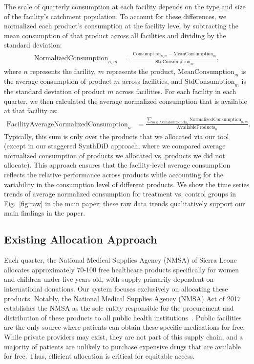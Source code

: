 \documentclass[12pt]{article}
\begin{document}
The scale of quarterly consumption at each facility depends on the type and size of the facility's catchment population. To account for these differences, we normalized each product's consumption at the facility level by subtracting the mean consumption of that product across all facilities and dividing by the standard deviation:
\begin{align*}
\text{NormalizedConsumption}_{n,m} &= \frac{\text{Consumption}_{n,m} - \text{MeanConsumption}_m}{\text{StdConsumption}_m},
\end{align*}
where $n$ represents the facility, $m$ represents the product, $\text{MeanConsumption}_m$ is the average consumption of product $m$ across facilities, and $\text{StdConsumption}_m$ is the standard deviation of product $m$ across facilities. For each facility in each quarter, we then calculated the average normalized consumption that is available at that facility as:
\begin{align*}
\text{FacilityAverageNormalizedConsumption}_n &= \frac{\sum_{m \in \text{AvailableProducts}_n} \text{NormalizedConsumption}_{n,m}}{\text{AvailableProducts}_n}.
\end{align*}
Typically, this sum is only over the products that we allocated via our tool (except in our staggered SynthDiD approach, where we compared average normalized consumption of products we allocated vs. products we did not allocate). This approach ensures that the facility-level average consumption reflects the relative performance across products while accounting for the variability in the consumption level of different products. We show the time series trends of average normalized consumption for treatment vs. control groups in Fig.~\ref{fig:raw} in the main paper; these raw data trends qualitatively support our main findings in the paper.

\subsection{Existing Allocation Approach}
\label{sup:ExistingAllocation}

Each quarter, the National Medical Supplies Agency (NMSA) of Sierra Leone allocates approximately 70-100 free healthcare products specifically for women and children under five years old, with supply primarily dependent on international donations. Our system focuses exclusively on allocating these products. Notably, the National Medical Supplies Agency (NMSA) Act of 2017 establishes the NMSA as the sole entity responsible for the procurement and distribution of these products to all public health institutions~\cite{nmsa_act2017}. Public facilities are the only source where patients can obtain these specific medications for free. While private providers may exist, they are not part of this supply chain, and a majority of patients are unlikely to purchase expensive drugs that are available for free. Thus, efficient allocation is critical for equitable access.
\end{document}
